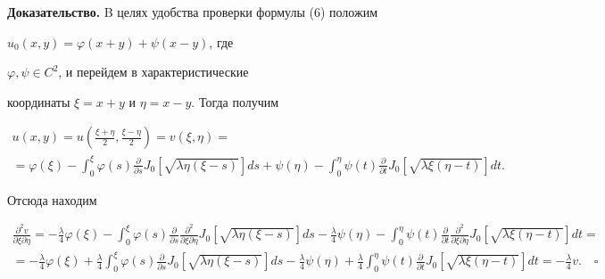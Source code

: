 {\bf Доказательство.} B целях удобства проверки формулы (6) положим


$u_0(x,y)=\varphi (x+y)+\psi (x-y)$, где


$\varphi ,\psi \in C^2$, и перейдем в характеристические


координаты $\xi =x+y$ и $\eta =x-y$. Тогда получим


\begin{multline*}


u(x,y)=u\left (\frac {\xi +\eta }{2},\frac {\xi -\eta }{2}\right )=


v(\xi ,\eta )= \\ =\varphi(\xi )-


\int_0^{\xi } \varphi(s)\frac {\partial }


{\partial s}J_0[\sqrt {\lambda \eta (\xi-s)}]ds+


\psi (\eta )-\int_0^{\eta } \psi (t)\frac {\partial }


{\partial t}J_0[\sqrt {\lambda \xi (\eta -t)}]dt.


\end{multline*}


Отсюда находим


\begin{multline*}


\frac {\partial ^2v}


{\partial \xi \partial \eta}=-\frac {\lambda }


{4}\varphi(\xi )-


\int_0^{\xi } \varphi(s)\frac {\partial }


{\partial s}\frac {\partial ^2}


{\partial \xi \partial \eta }J_0[\sqrt {\lambda \eta (\xi-s)}]ds-


\frac {\lambda }


{4}\psi (\eta )-\int_0^{\eta } \psi (t)\frac {\partial }


{\partial t}\frac {\partial ^2}


{\partial \xi \partial \eta }J_0[\sqrt {\lambda \xi (\eta -t)}]dt= \\


%


=-\frac {\lambda }{4}\varphi(\xi )+


\frac {\lambda }{4}\int_0^{\xi } \varphi(s)\frac {\partial }


{\partial s}J_0[\sqrt {\lambda \eta (\xi-s)}]ds-


\frac {\lambda }{4}


\psi (\eta )+\frac {\lambda }


{4}\int_0^{\eta } \psi (t)\frac {\partial }


{\partial t}J_0[\sqrt {\lambda \xi (\eta -t)}]dt=-\frac {\lambda }{4}v.


\quad\square


\end{multline*}





